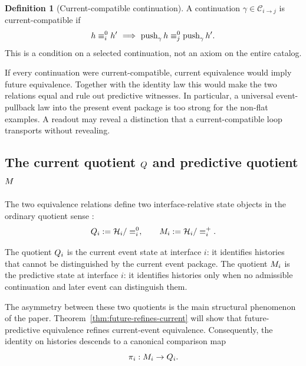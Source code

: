 \documentclass[11pt]{article}
\theoremstyle{definition}
\newtheorem{definition}[theorem]{Definition}
\begin{document}
\begin{definition}[Current-compatible continuation]\label{def:current-compatible}
A continuation $\gamma\in\mathcal{C}_{i\to j}$ is current-compatible if
\[
h\equiv^{0}_i h'\ \Longrightarrow\
\operatorname{push}_{\gamma}h\equiv^{0}_j\operatorname{push}_{\gamma}h'.
\]
This is a condition on a selected continuation, not an axiom on the entire catalog.
\end{definition}

If every continuation were current-compatible, current equivalence would imply future equivalence. Together with the identity law this would make the two relations equal and rule out predictive witnesses. In particular, a universal event-pullback law into the present event package is too strong for the non-flat examples. A readout may reveal a distinction that a current-compatible loop transports without revealing.

\subsection{The current quotient \texorpdfstring{$Q$}{Q} and predictive quotient \texorpdfstring{$M$}{M}}\label{subsec:rtp-quotients}
The two equivalence relations define two interface-relative state objects in the ordinary quotient sense \citep{MacLaneBirkhoff1999Algebra,BurrisSankappanavar1981CourseUniversalAlgebra}:
\begin{equation}
Q_i := \mathcal{H}_i / \equiv^{0}_i,
\qquad
M_i := \mathcal{H}_i / \equiv^{+}_i.
\label{eq:quotients}
\end{equation}

The quotient $Q_i$ is the current event state at interface $i$: it identifies histories that cannot be distinguished by the current event package. The quotient $M_i$ is the predictive state at interface $i$: it identifies histories only when no admissible continuation and later event can distinguish them.

The asymmetry between these two quotients is the main structural phenomenon of the paper. Theorem~\ref{thm:future-refines-current} will show that future-predictive equivalence refines current-event equivalence. Consequently, the identity on histories descends to a canonical comparison map
\begin{equation}
\pi_i : M_i \to Q_i.
\label{eq:comparison-map}
\end{equation}
\end{document}
